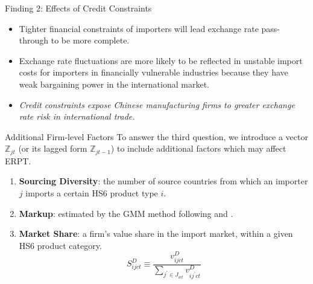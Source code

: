 \documentclass[10pt]{beamer}
\begin{document}
\begin{frame}{Finding 2: Effects of Credit Constraints}
	\begin{tcolorbox}[colback=blue!5!white, colframe=blue!75!black,title=Key Finding 2]
		\begin{itemize}
			\item Tighter financial constraints of importers will lead exchange rate pass-through to be more complete.
		\end{itemize}
	\end{tcolorbox}
	\begin{itemize}
		\item Exchange rate fluctuations are more likely to be reflected in unstable import costs for importers in financially vulnerable industries because they have weak bargaining power in the international market.
		\item \textit{Credit constraints expose Chinese manufacturing firms to greater exchange rate risk in international trade.}
	\end{itemize}
\end{frame}


\begin{frame}{Additional Firm-level Factors}
	To answer the third question, we introduce a vector $\mathbb{Z}_{jt}$ (or its lagged form $\mathbb{Z}_{jt-1}$) to include additional factors which may affect ERPT.
	\begin{enumerate}
		\item \textbf{Sourcing Diversity}: the number of source countries from which an importer $j$ imports a certain HS6 product type $i$. 
		\item \textbf{Markup}: estimated by the GMM method following \cite{dlw2012} and \cite{bkl2021}.
		\item \textbf{Market Share}: a firm’s value share in the import market, within a given HS6 product category.
		$$
		S^{D}_{ijct} \equiv \frac{v^{D}_{ijct}}{\sum_{j^{\prime} \in J_{ict}} v^{D}_{ij^{\prime}ct}}
		$$
	\end{enumerate}
\end{frame}
\end{document}

